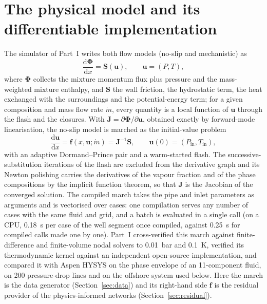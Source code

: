 \documentclass[a4paper,fleqn]{cas-sc}
\newcommand{\mdot}{\dot{m}}
\newcommand{\dd}{\mathrm{d}}
\newcommand{\bPhi}{\boldsymbol{\Phi}}
\newcommand{\bS}{\mathbf{S}}
\newcommand{\bu}{\mathbf{u}}
\newcommand{\bJ}{\mathbf{J}}
\begin{document}
\section{The physical model and its differentiable implementation}\label{sec:model}

The simulator of Part~I writes both flow models (no-slip and mechanistic) as
\begin{equation}\label{eq:flux}
\frac{\dd \bPhi}{\dd x} = \bS(\bu), \qquad \bu = (P, T),
\end{equation}
where $\bPhi$ collects the mixture momentum flux plus pressure and the mass-weighted mixture enthalpy, and $\bS$ the wall friction, the hydrostatic term, the heat exchanged with the surroundings and the potential-energy term; for a given composition and mass flow rate $\mdot$, every quantity is a local function of $\bu$ through the flash and the closures. With $\bJ = \partial\bPhi/\partial\bu$, obtained exactly by forward-mode linearisation, the no-slip model is marched as the initial-value problem
\begin{equation}\label{eq:march}
\frac{\dd\bu}{\dd x} = \mathbf{f}(x, \bu; \mdot) = \bJ^{-1}\bS, \qquad \bu(0) = (P_\mathrm{in}, T_\mathrm{in}),
\end{equation}
with an adaptive Dormand--Prince pair \citep{dormand1980} and a warm-started flash. The successive-substitution iterations of the flash are excluded from the derivative graph and its Newton polishing carries the derivatives of the vapour fraction and of the phase compositions by the implicit function theorem, so that $\bJ$ is the Jacobian of the converged solution. The compiled march takes the pipe and inlet parameters as arguments and is vectorised over cases: one compilation serves any number of cases with the same fluid and grid, and a batch is evaluated in a single call (on a CPU, \SI{0.18}{\second} per case of the well segment once compiled, against \SI{0.25}{\second} for compiled calls made one by one). Part~I cross-verified this march against finite-difference and finite-volume nodal solvers to \SI{0.01}{\bar} and \SI{0.1}{\kelvin}, verified its thermodynamic kernel against an independent open-source implementation, and compared it with Aspen HYSYS on the phase envelope of an 11-component fluid, on 200 pressure-drop lines and on the offshore system used below. Here the march is the data generator (Section~\ref{sec:data}) and its right-hand side $\mathbf{f}$ is the residual provider of the physics-informed networks (Section~\ref{sec:residual}).
\end{document}
